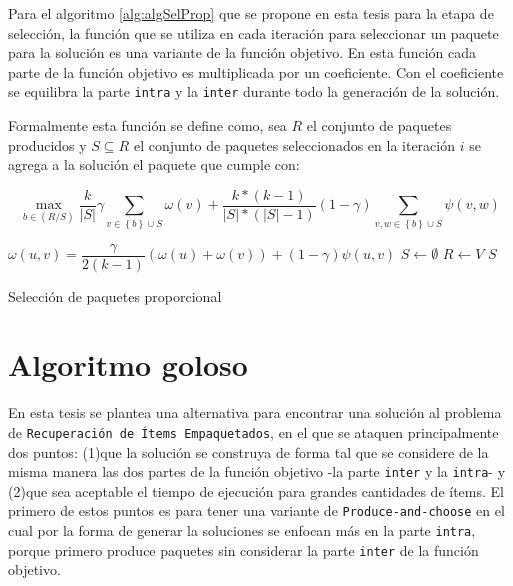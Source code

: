 Para el algoritmo \ref{alg:algSelProp} que se propone en esta tesis para la etapa de selección, la función que se utiliza en cada iteración para seleccionar un paquete para la solución es una variante de la función objetivo. En esta función cada parte de la función objetivo es multiplicada por un coeficiente. Con el coeficiente se equilibra la parte \texttt{intra} y la \texttt{inter} durante todo la generación de la solución.   

Formalmente esta función se define como, sea $R$ el conjunto de paquetes producidos y $S \subseteq R$ el conjunto de paquetes seleccionados en la iteración $i$ se agrega a la solución el paquete que cumple con:

\begin{equation}
\max_{b \in (R/S)}{\dfrac{k}{|S|}} \gamma \sum_{v \in \left\{b\right\} \cup S}{\omega(v)} + \dfrac{k * (k-1)}{|S| * (|S|-1)} (1-\gamma) \sum_{v,w \in \left\{b\right\} \cup S}{\psi(v,w)}
\end{equation}

\begin{center}
	\begin{algorithm}[H]
	\DontPrintSemicolon
	\SetAlgoLined
		$\omega(u,v) = \dfrac{\gamma}{2( k - 1)} (\omega(u) + \omega(v)) + (1 - \gamma)\psi(u,v)$\;
		$S \leftarrow \emptyset$\;
		$R \leftarrow V$\;
		\Return $S$\;
	\caption{Selección de paquetes proporcional}\label{alg:algSelProp}
	\end{algorithm}
\end{center}

\section{Algoritmo goloso}

En esta tesis se plantea una alternativa para encontrar una solución al problema de \texttt{Recuperación de Ítems Empaquetados}, en el que se ataquen principalmente dos puntos: (1)que la solución se construya de forma tal que se considere de la misma manera las dos partes de la función objetivo -la parte \texttt{inter} y la \texttt{intra}- y (2)que sea aceptable el tiempo de ejecución para grandes cantidades de ítems. El primero de estos puntos es para tener una variante de \texttt{Produce-and-choose} en el cual por la forma de generar la soluciones se enfocan más en la parte \texttt{intra}, porque primero produce paquetes sin considerar la parte \texttt{inter} de la función objetivo.

